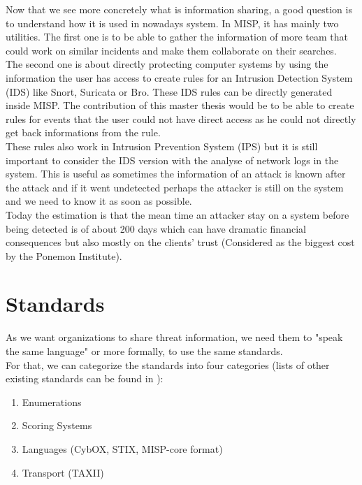 \documentclass{eplmastersthesis}
\begin{document}
Now that we see more concretely what is information sharing, a good question is to understand how it is used in nowadays system. In MISP, it has mainly two utilities. The first one is to be able to gather the information of more team that could work on similar incidents and make them collaborate on their searches.\\
The second one is about directly protecting computer systems by using the information the user has access to create rules for an Intrusion Detection System (IDS) like Snort, Suricata or Bro. These IDS rules can be directly generated inside MISP. The contribution of this master thesis would be to be able to create rules for events that the user could not have direct access as he could not directly get back informations from the rule.\\
These rules also work in Intrusion Prevention System (IPS) but it is still important to consider the IDS version with the analyse of network logs in the system. This is useful as sometimes the information of an attack is known after the attack and if it went undetected perhaps the attacker is still on the system and we need to know it as soon as possible.\\
Today the estimation is that the mean time an attacker stay on a system before being detected is of about 200 days which can have dramatic financial consequences but also mostly on the clients' trust (Considered as the biggest cost by the Ponemon Institute).



\section{Standards}
As we want organizations to share threat information, we need them to "speak the same language" or more formally, to use the same standards.\\
For that, we can categorize the standards into four categories (lists of other existing standards can be found in \cite{AwesomeTreat, mohaisen2017rethinking}):
\begin{enumerate}
\item Enumerations
\item Scoring Systems
\item Languages (CybOX, STIX, MISP-core format)
\item Transport (TAXII)
\end{enumerate}
\end{document}
